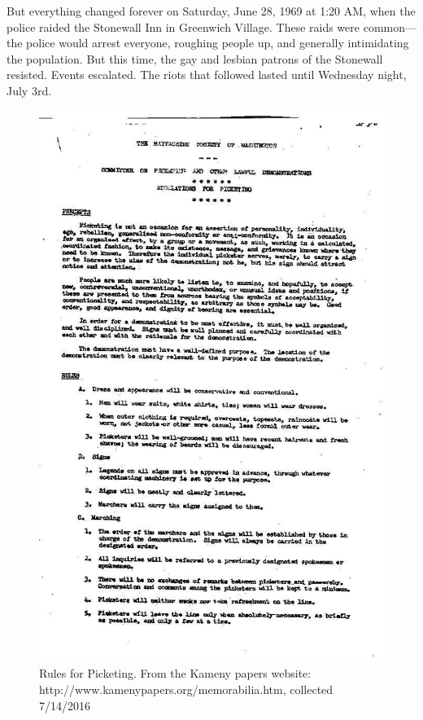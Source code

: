 But everything changed forever on Saturday, June 28, 1969 at 1:20 AM, when the police raided the Stonewall Inn in Greenwich Village. These raids were common---the police would arrest everyone, roughing people up, and generally intimidating the population. But this time, the gay and lesbian patrons of the Stonewall resisted. Events escalated. The riots that followed lasted until Wednesday night, July 3rd. 
\begin{figure}[h]
 \centering

 \includegraphics{../images/KamenyPicketInstructions.jpg}
 \caption{Rules for Picketing. From the Kameny papers website: http://www.kamenypapers.org/memorabilia.htm, collected 7/14/2016}
\label{fig: MattachineRules}
\end{figure}


